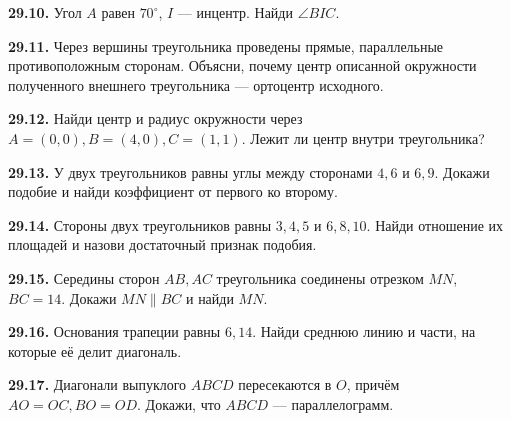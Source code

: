 \noindent\begin{minipage}[t]{\linewidth}\textbf{29.10.} Угол \(A\) равен \(70^\circ\), \(I\) — инцентр. Найди \(\angle BIC\).\par\end{minipage}\par
\noindent\begin{minipage}[t]{\linewidth}\textbf{29.11.}\starmark{} Через вершины треугольника проведены прямые, параллельные противоположным сторонам. Объясни, почему центр описанной окружности полученного внешнего треугольника — ортоцентр исходного.\par\end{minipage}\par
\noindent\begin{minipage}[t]{\linewidth}\textbf{29.12.} Найди центр и радиус окружности через \(A=(0,0),B=(4,0),C=(1,1)\). Лежит ли центр внутри треугольника?\par\end{minipage}\par
\noindent\begin{minipage}[t]{\linewidth}\textbf{29.13.}\starmark{} У двух треугольников равны углы между сторонами \(4,6\) и \(6,9\). Докажи подобие и найди коэффициент от первого ко второму.\par\end{minipage}\par
\noindent\begin{minipage}[t]{\linewidth}\textbf{29.14.} Стороны двух треугольников равны \(3,4,5\) и \(6,8,10\). Найди отношение их площадей и назови достаточный признак подобия.\par\end{minipage}\par
\noindent\begin{minipage}[t]{\linewidth}\textbf{29.15.}\starmark{} Середины сторон \(AB,AC\) треугольника соединены отрезком \(MN\), \(BC=14\). Докажи \(MN\parallel BC\) и найди \(MN\).\par\end{minipage}\par
\noindent\begin{minipage}[t]{\linewidth}\textbf{29.16.} Основания трапеции равны \(6,14\). Найди среднюю линию и части, на которые её делит диагональ.\par\end{minipage}\par
\noindent\begin{minipage}[t]{\linewidth}\textbf{29.17.}\starmark{} Диагонали выпуклого \(ABCD\) пересекаются в \(O\), причём \(AO=OC,BO=OD\). Докажи, что \(ABCD\) — параллелограмм.\par\end{minipage}\par
